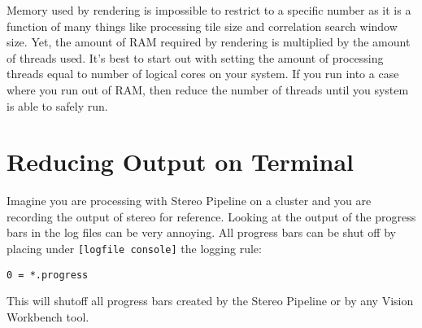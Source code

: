 Memory used by rendering is impossible to restrict to a specific
number as it is a function of many things like processing tile size
and correlation search window size. Yet, the amount of RAM required by
rendering is multiplied by the amount of threads used. It's best to
start out with setting the amount of processing threads equal to
number of logical cores on your system. If you run into a case where
you run out of RAM, then reduce the number of threads until you system
is able to safely run.

\section {Reducing Output on Terminal}

Imagine you are processing with Stereo Pipeline on a cluster and you
are recording the output of stereo for reference. Looking at the
output of the progress bars in the log files can be very annoying. All
progress bars can be shut off by placing under
\verb#[logfile console]# the logging rule:

\begin{verbatim}
0 = *.progress
\end{verbatim}

This will shutoff all progress bars created by the Stereo Pipeline or
by any Vision Workbench tool.
